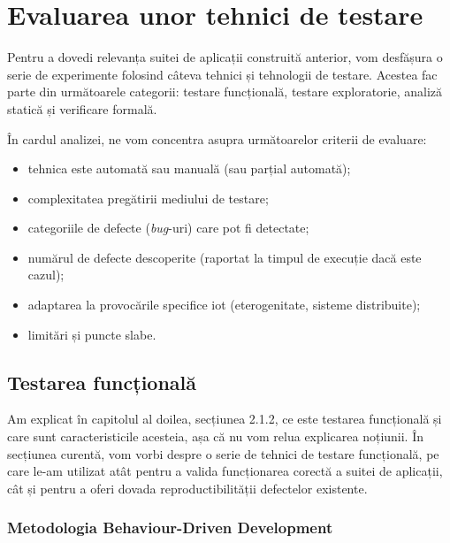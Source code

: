 \chapter{Evaluarea unor tehnici de testare}

Pentru a dovedi relevanța suitei de aplicații construită anterior, vom desfășura o serie de experimente folosind câteva tehnici și tehnologii de testare. Acestea fac parte din următoarele categorii: testare funcțională, testare exploratorie, analiză statică și verificare formală.

În cardul analizei, ne vom concentra asupra următoarelor criterii de evaluare:

\begin{itemize}
    \item tehnica este automată sau manuală (sau parțial automată);
    \item complexitatea pregătirii mediului de testare;
    \item categoriile de defecte (\textit{bug}-uri) care pot fi detectate;
    \item numărul de defecte descoperite (raportat la timpul de execuție dacă este cazul);
    \item adaptarea la provocările specifice \acrshort{iot} (eterogenitate, sisteme distribuite);
    \item limitări și puncte slabe.
\end{itemize} 

\section{Testarea funcțională}

Am explicat în capitolul al doilea, secțiunea 2.1.2, ce este testarea funcțională și care sunt caracteristicile acesteia, așa că nu vom relua explicarea noțiunii. În secțiunea curentă, vom vorbi despre o serie de tehnici de testare funcțională, pe care le-am utilizat atât pentru a valida funcționarea corectă a suitei de aplicații, cât și pentru a oferi dovada reproductibilității defectelor existente.


\subsection*{Metodologia Behaviour-Driven Development}
\label{cap:testare_bdd}

